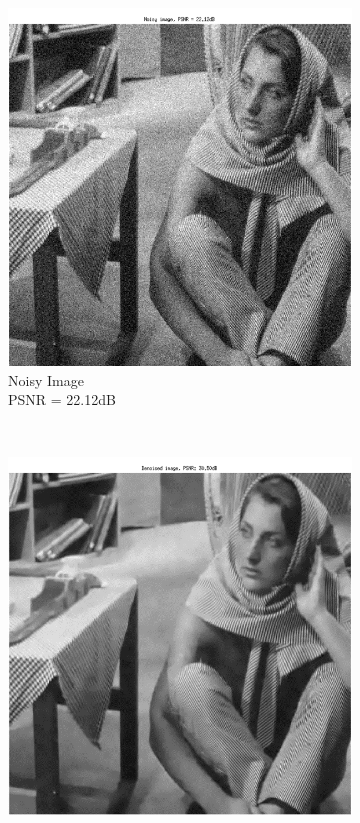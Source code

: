 \documentclass{article} %
\begin{document}
\begin{figure}[h]
        \centering
        \begin{subfigure}[b]{0.5\textwidth}
                \includegraphics[width=\textwidth]{images/Noisy}
                \caption{Noisy Image\\PSNR = 22.12dB}
                \label{fig:NoisyIm}
        \end{subfigure}%
        ~ %
        \begin{subfigure}[b]{0.5\textwidth}
                \includegraphics[width=\textwidth]{images/Denoised_FeatureSign}

\end{subfigure}
\end{figure}
\end{document}
